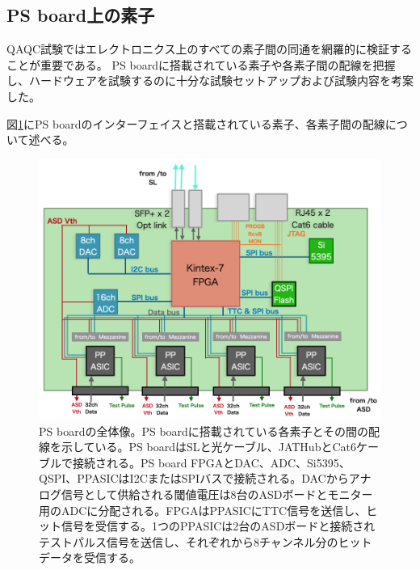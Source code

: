 \newpage
\subsection{PS board上の素子}
\label{subsec_PSBelements}
QAQC試験ではエレクトロニクス上のすべての素子間の同通を網羅的に検証することが重要である。
PS boardに搭載されている素子や各素子間の配線を把握し、ハードウェアを試験するのに十分な試験セットアップおよび試験内容を考案した。

図\ref{PSBconcept}にPS boardのインターフェイスと搭載されている素子、各素子間の配線について述べる。

\begin{figure} 
\centering
\includegraphics[width=16cm]{fig/PSBoverall.png}
\caption[PSboardの全体像]{PS boardの全体像。PS boardに搭載されている各素子とその間の配線を示している。PS boardはSLと光ケーブル、JATHubとCat6ケーブルで接続される。PS board FPGAとDAC、ADC、Si5395、QSPI、PPASICはI2CまたはSPIバスで接続される。DACからアナログ信号として供給される閾値電圧は8台のASDボードとモニター用のADCに分配される。FPGAはPPASICにTTC信号を送信し、ヒット信号を受信する。1つのPPASICは2台のASDボードと接続されテストパルス信号を送信し、それぞれから8チャンネル分のヒットデータを受信する。}
\label{PSBconcept}
\end{figure}

\baselineskip


